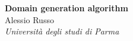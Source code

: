 \documentclass[a4paper,12pt]{article}
\begin{document}
\pagestyle{fancy}
\thispagestyle{empty}
\fancyhead[R]{}
\fancyhead[L]{}
\renewcommand*{\thefootnote}{\fnsymbol{footnote}}
\begin{center}
\Large{\textbf{Domain generation algorithm}}
\vspace{0.4cm}
\normalsize
\\ Alessio Russo \\
\vspace{0.1cm}
\textit{Università degli studi di Parma}
\vspace{0.1cm}
\medskip
\normalsize
\end{center}
\begin{multicols}{2}

\end{multicols}
\printbibliography
\end{document}
